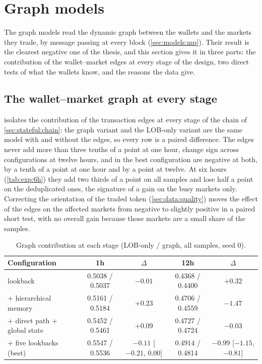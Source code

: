 \section{Graph models}
\label{ch:graph}

The graph models read the dynamic graph between the wallets and the markets they trade,
by message passing at every block (\cref{sec:models:mp}).  Their result is the clearest
negative one of the thesis, and this section gives it in three parts: the contribution of
the wallet--market edges at every stage of the design, two direct tests of what the wallets
know, and the reasons the data give.

\subsection{The wallet--market graph at every stage}
\label{sec:graph:stages}
\label{sec:exp:graph}

 isolates the contribution of the transaction edges at every stage of
the chain of \cref{sec:stateful:chain}: the graph variant and the LOB-only variant are the
same model with and without the edges, so every row is a paired difference.  The edges
never add more than three tenths of a point at one hour, change sign across configurations
at twelve hours, and in the best configuration are negative at both, by a tenth of a point
at one hour and by a point at twelve.  At six hours
(\cref{tab:exp:6h}) they add two thirds of a point on all samples and lose half a point on
the deduplicated ones, the signature of a gain on the busy markets only.  Correcting the
orientation of the traded token (\cref{sec:data:quality}) moves the effect of the edges on
the affected markets from negative to slightly positive in a paired short test, with no
overall gain because those markets are a small share of the samples.

\begin{table}[t]
\centering
\caption{Graph contribution at each stage (LOB-only / graph, all samples, seed 0).}
\label{tab:exp:graph}
\begin{fittable}\begin{tabular}{lcccc}
\toprule
Configuration & 1h & $\Delta$ & 12h & $\Delta$ \\
\midrule
lookback                      & 0.5038 / 0.5037 & $-0.01$ & 0.4368 / 0.4400 & $+0.32$ \\
+ hierarchical memory         & 0.5161 / 0.5184 & $+0.23$ & 0.4706 / 0.4559 & $-1.47$ \\
+ direct path + global state  & 0.5452 / 0.5461 & $+0.09$ & 0.4727 / 0.4724 & $-0.03$ \\
+ five lookbacks (best)       & 0.5547 / 0.5536 & $-0.11$ [$-0.21$, $0.00$] & 0.4914 / 0.4814 & $-0.99$ [$-1.15$, $-0.81$] \\
\bottomrule
\end{tabular}\end{fittable}
\end{table}

